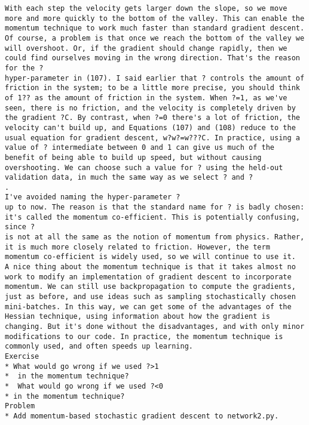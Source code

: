 \begin{lstlisting}
With each step the velocity gets larger down the slope, so we move more and more quickly to the bottom of the valley. This can enable the momentum technique to work much faster than standard gradient descent. Of course, a problem is that once we reach the bottom of the valley we will overshoot. Or, if the gradient should change rapidly, then we could find ourselves moving in the wrong direction. That's the reason for the ?
hyper-parameter in (107). I said earlier that ? controls the amount of friction in the system; to be a little more precise, you should think of 1?? as the amount of friction in the system. When ?=1, as we've seen, there is no friction, and the velocity is completely driven by the gradient ?C. By contrast, when ?=0 there's a lot of friction, the velocity can't build up, and Equations (107) and (108) reduce to the usual equation for gradient descent, w?w?=w???C. In practice, using a value of ? intermediate between 0 and 1 can give us much of the benefit of being able to build up speed, but without causing overshooting. We can choose such a value for ? using the held-out validation data, in much the same way as we select ? and ?
.
I've avoided naming the hyper-parameter ?
up to now. The reason is that the standard name for ? is badly chosen: it's called the momentum co-efficient. This is potentially confusing, since ?
is not at all the same as the notion of momentum from physics. Rather, it is much more closely related to friction. However, the term momentum co-efficient is widely used, so we will continue to use it.
A nice thing about the momentum technique is that it takes almost no work to modify an implementation of gradient descent to incorporate momentum. We can still use backpropagation to compute the gradients, just as before, and use ideas such as sampling stochastically chosen mini-batches. In this way, we can get some of the advantages of the Hessian technique, using information about how the gradient is changing. But it's done without the disadvantages, and with only minor modifications to our code. In practice, the momentum technique is commonly used, and often speeds up learning.
Exercise
* What would go wrong if we used ?>1
*  in the momentum technique?
*  What would go wrong if we used ?<0
* in the momentum technique? 
Problem
* Add momentum-based stochastic gradient descent to network2.py. 

\end{lstlisting}
